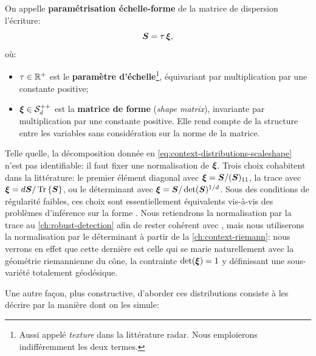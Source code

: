 \begin{definition}
\label{def:context-distributions-scaleshape}
  On appelle \textbf{paramétrisation échelle-forme} de la matrice de dispersion l'écriture:
\begin{equation}
  \boldsymbol{S} = \tau\,\boldsymbol{\xi},
  \label{eq:context-distributions-scaleshape}
\end{equation}
  où:
  \begin{itemize}
    \item $\tau\in\mathbb{R}^+$ est le \textbf{paramètre d'échelle}\footnote{Aussi appelé \textit{texture} dans la littérature radar. Nous emploierons indifféremment les deux termes.}, équivariant par multiplication par une constante positive;
    \item $\boldsymbol{\xi}\in\mathcal{S}_{d}^{++}$ est la \textbf{matrice de forme} (\textit{shape matrix}), invariante par multiplication par une constante positive. Elle rend compte de la structure entre les variables sans considération sur la norme de la matrice.
  \end{itemize}
\end{definition}

  Telle quelle, la décomposition donnée en \cref{eq:context-distributions-scaleshape} n'est pas identifiable: il faut fixer une normalisation de $\boldsymbol{\xi}$. Trois choix cohabitent dans la littérature: le premier élément diagonal  avec $\boldsymbol{\xi} = \boldsymbol{S}/(\boldsymbol{S})_{11}$, la trace  avec $\boldsymbol{\xi} = d\boldsymbol{S}/\operatorname{\operatorname{Tr}}\left\{\boldsymbol{S}\right\}$, ou le déterminant  avec $\boldsymbol{\xi} = \boldsymbol{S}/\operatorname{\operatorname{det}}(\boldsymbol{S})^{1/d}$. Sous des conditions de régularité faibles, ces choix sont essentiellement équivalents vis-à-vis des problèmes d'inférence sur la forme . Nous retiendrons la normalisation par la trace au \cref{ch:robust-detection} afin de rester cohérent avec \cite{6263313}, mais nous utiliserons la normalisation par le déterminant à partir de la \cref{ch:context-riemann}: nous verrons en effet que cette dernière est celle qui se marie naturellement avec la géométrie riemannienne du cône, la contrainte $\operatorname{\operatorname{det}}(\boldsymbol{\xi})=1$ y définissant une sous-variété totalement géodésique.

Une autre façon, plus constructive, d'aborder ces distributions consiste à les décrire par la manière dont on les simule:

